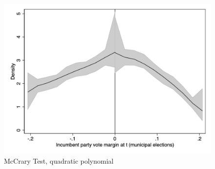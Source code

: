 \documentclass[12pt]{amsart}
\makeatletter
\def\section{\@startsection{section}{1}
	\z@{1.0\linespacing\@plus\linespacing}{.5\linespacing}{\Large}}
\numberwithin{equation}{section}
\theoremstyle{definition}
\theoremstyle{definition}
\theoremstyle{definition}
\makeatother
\begin{document}
\begin{appendix}
\begin{figure}[h]
\end{figure}  
   
\clearpage  



\begin{figure}[H]
\centering
\caption{McCrary Test, quadratic polynomial}
  \label{fig:mccrary}

 \includegraphics[width=1\textwidth]{Figures/mccrary_test_pol2.png}
       \captionsetup{justification=centering}
 
\end{figure} 


    
   
 \clearpage
 

\end{appendix}
\end{document}
